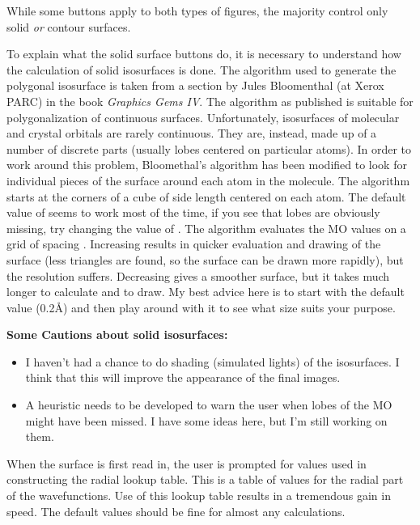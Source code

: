 While some buttons apply to both types of figures, the majority
control only solid {\em or} contour surfaces.

To explain what the solid surface buttons do, it is necessary to
understand how the calculation of solid isosurfaces is done.  The algorithm
used to generate the polygonal isosurface is taken from a section by
Jules Bloomenthal (at Xerox PARC) in the book {\em Graphics Gems IV}.
The algorithm as published is suitable for polygonalization of
continuous surfaces.  Unfortunately, isosurfaces of molecular and
crystal orbitals are rarely continuous.  They are, instead, made up of
a number of discrete parts (usually lobes centered on particular
atoms).  In order to work around this problem, Bloomethal's algorithm
has been modified to look for individual pieces of the surface around
each atom in the molecule.  The algorithm starts at the corners of a
cube of side length  centered on each atom.  The
default value of  seems to work most of the time,
if you see that lobes are obviously missing, try changing the value of
.   The algorithm evaluates the MO values on a
grid of spacing .  Increasing 
results in quicker evaluation and drawing of the surface (less
triangles are found, so the surface can be drawn more rapidly), but
the resolution suffers.  Decreasing  gives a
smoother surface, but it takes much longer to calculate and to draw.
My best advice here is to start with the default value (0.2\AA) and
then play around with it to see what size suits your purpose.


{\bf Some Cautions about solid isosurfaces:} 

\begin{itemize}

\item I haven't had a
chance to do shading (simulated lights) of the isosurfaces.  I
think that this will improve the appearance of the final images.  

\item A heuristic needs to be developed to warn the user when lobes of
the MO might have been missed.  I have some ideas here, but I'm still
working on them.

\end{itemize}

When the surface is first read in, the user is prompted for values
used in constructing the radial lookup table.   This is a table of
values for the radial part of the wavefunctions.  Use of this lookup
table results in a tremendous gain in speed.  The default values
should be fine for almost any calculations.


